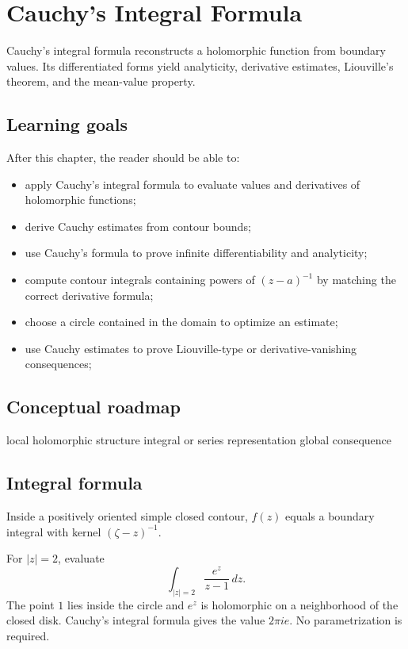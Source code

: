 \chapter{Cauchy's Integral Formula}
\label{ch:iv06}

Cauchy's integral formula reconstructs a holomorphic function from boundary values. Its differentiated forms yield analyticity, derivative estimates, Liouville's theorem, and the mean-value property.

\section*{Learning goals}
After this chapter, the reader should be able to:
\begin{itemize}
\item apply Cauchy's integral formula to evaluate values and derivatives of holomorphic functions;
\item derive Cauchy estimates from contour bounds;
\item use Cauchy's formula to prove infinite differentiability and analyticity;
\item compute contour integrals containing powers of \((z-a)^{-1}\) by matching the correct derivative formula;
\item choose a circle contained in the domain to optimize an estimate;
\item use Cauchy estimates to prove Liouville-type or derivative-vanishing consequences;
\end{itemize}
\section*{Conceptual roadmap}
\volroadmap
  {local holomorphic structure}
  {integral or series representation}
  {global consequence}

\section{Integral formula}
Inside a positively oriented simple closed contour, $f(z)$ equals a boundary integral with kernel $(\zeta-z)^{-1}$.

\begin{example}\label{ex:iv06-expand-01}
For \(|z|=2\), evaluate
\[
\int_{|z|=2}\frac{e^z}{z-1}\,dz.
\]
The point \(1\) lies inside the circle and \(e^z\) is holomorphic on a neighborhood of the closed disk. Cauchy's integral formula gives the value \(2\pi i e\). No parametrization is required.
\end{example}
